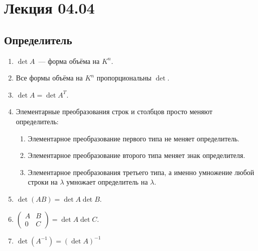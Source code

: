 \section{Лекция 04.04}
\subsection{Определитель}
\begin{theorem}\leavevmode
    \begin{enumerate}
        \item $\det A$~--- форма объёма на $K^n$.
        \item Все формы объёма на $K^n$ пропорциональны $\det$.
        \item $\det A = \det A^T$.
        \item Элементарные преобразования строк и столбцов просто меняют определитель:
            \begin{enumerate}
                \item Элементарное преобразование первого типа не меняет определитель.
                \item Элементарное преобразование второго типа меняет знак определителя.
                \item Элементарное преобразования третьего типа, а именно умножение любой строки на $\lambda$ умножает
                    определитель на $\lambda$.
            \end{enumerate}
        \item  $\det(AB) = \det A\det B$.
        \item  $\left(\begin{array}{c|c}
                A & B\\
                \hline
                0 & C
        \end{array}\right) = \det A \det C
        .$ 
    \item $\det(A^{-1}) = (\det A)^{-1}$
    \end{enumerate}
\end{theorem}
